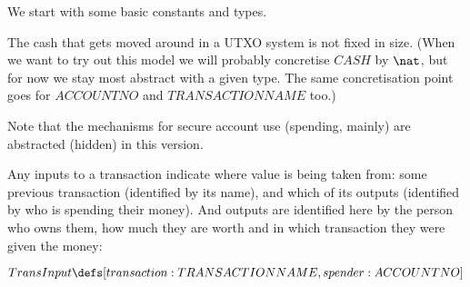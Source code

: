 \documentclass[11pt]{amsart}
\begin{document}
We start with some basic constants and types.



%
%
%

The cash that gets moved around in a UTXO system is not fixed in size. (When we want to try out this model we will probably concretise $CASH$ by $\nat$, but for now we stay most abstract with a given type. The same concretisation point goes for $ACCOUNTNO$ and $TRANSACTIONNAME$ too.)


Note that the mechanisms for secure account use (spending, mainly) are abstracted (hidden) in this version. 


Any inputs to a transaction indicate where value is being taken from: some previous
 transaction (identified by its name), and which of its outputs (identified by who is spending their money). And outputs are identified here by the person who owns them, how much they are worth and in which transaction they were given the money:
 

 \[
  TransInput \defs [transaction : TRANSACTIONNAME, spender : ACCOUNTNO]
\]
\end{document}
